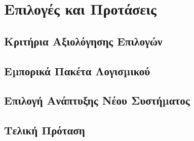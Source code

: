 \section{Επιλογές και Προτάσεις}

	\subsection{Κριτήρια Αξιολόγησης Επιλογών}
	\subsection{Εµπορικά Πακέτα Λογισµικού}
	\subsection{Επιλογή Ανάπτυξης Νέου Συστήµατος}
	\subsection{Τελική Πρόταση}

